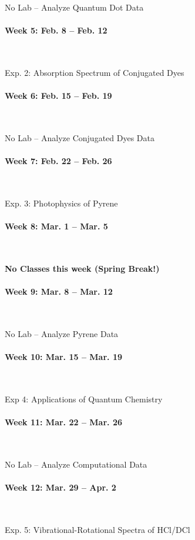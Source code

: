 \documentclass[12pt, letterpaper]{article}
\begin{document}
No Lab -- Analyze Quantum Dot Data

\paragraph{Week 5: Feb. 8 -- Feb. 12}~

Exp. 2: Absorption Spectrum of Conjugated Dyes

\paragraph{Week 6: Feb. 15 -- Feb. 19}~

No Lab -- Analyze Conjugated Dyes Data

\paragraph{Week 7: Feb. 22 -- Feb. 26}~

Exp. 3: Photophysics of Pyrene

\paragraph{Week 8: Mar. 1 -- Mar. 5}~

\textbf{No Classes this week (Spring Break!)}

\paragraph{Week 9: Mar. 8 -- Mar. 12}~

No Lab -- Analyze Pyrene Data

\paragraph{Week 10: Mar. 15 -- Mar. 19}~

Exp 4: Applications of Quantum Chemistry

\paragraph{Week 11: Mar. 22 -- Mar. 26}~

No Lab -- Analyze Computational Data

\paragraph{Week 12: Mar. 29 -- Apr. 2}~

Exp. 5: Vibrational-Rotational Spectra of HCl/DCl
\end{document}
